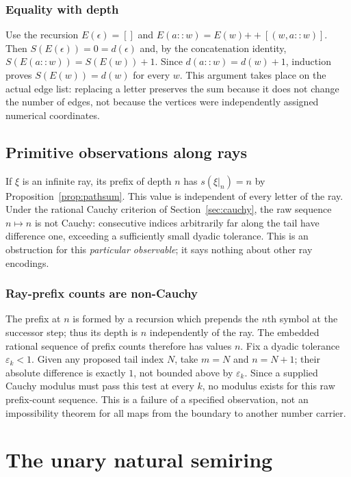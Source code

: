 \documentclass[11pt,reqno]{amsart}
\theoremstyle{definition}\newtheorem{definition}[theorem]{Definition}
\theoremstyle{remark}\newtheorem{remark}[theorem]{Remark}
\newcommand{\eps}{\varepsilon}
\begin{document}
\subsubsection*{Equality with depth}\label{supp:3-2}
Use the recursion $E(\epsilon)=[]$ and $E(a::w)=E(w)\mathbin{+\!+}[(w,a::w)]$. Then $S(E(\epsilon))=0=d(\epsilon)$ and, by the concatenation identity, $S(E(a::w))=S(E(w))+1$. Since $d(a::w)=d(w)+1$, induction proves $S(E(w))=d(w)$ for every $w$. This argument takes place on the actual edge list: replacing a letter preserves the sum because it does not change the number of edges, not because the vertices were independently assigned numerical coordinates.
\medskip

\subsection{Primitive observations along rays}\label{main:sub-06}
If $\xi$ is an infinite ray, its prefix of depth $n$ has $s(\xi|_n)=n$ by Proposition~\ref{prop:pathsum}. This value is independent of every letter of the ray. Under the rational Cauchy criterion of Section~\ref{sec:cauchy}, the raw sequence $n\mapsto n$ is not Cauchy: consecutive indices arbitrarily far along the tail have difference one, exceeding a sufficiently small dyadic tolerance. This is an obstruction for this \emph{particular observable}; it says nothing about other ray encodings.


\medskip
\subsubsection*{Ray-prefix counts are non-Cauchy}\label{supp:3-3}
The prefix at $n$ is formed by a recursion which prepends the $n$th symbol at the successor step; thus its depth is $n$ independently of the ray. The embedded rational sequence of prefix counts therefore has values $n$. Fix a dyadic tolerance $\eps_k<1$. Given any proposed tail index $N$, take $m=N$ and $n=N+1$; their absolute difference is exactly $1$, not bounded above by $\eps_k$. Since a supplied Cauchy modulus must pass this test at every $k$, no modulus exists for this raw prefix-count sequence. This is a failure of a specified observation, not an impossibility theorem for all maps from the boundary to another number carrier.
\medskip

\clearpage
\section{The unary natural semiring}\label{sec:naturals}
\end{document}

